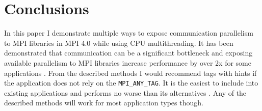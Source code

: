 \documentclass[sigconf]{acmart}
\begin{document}
\section{Conclusions}

In this paper I demonstrate multiple ways to expose communication parallelism to MPI libraries in MPI 4.0 while using CPU multithreading.
It has been demonstrated that communication can be a significant bottleneck and exposing available parallelism to MPI libraries increase performance by over 2x for some applications \cite{zambreLogicalParallel2021}.
From the described methods I would recommend tags with hints if the application does not rely on the \verb|MPI_ANY_TAG|.
It is the easiest to include into existing applications and performs no worse than its alternatives \cite{zambreLessonsLearned2022}.
Any of the described methods will work for most application types though.




\end{document}
